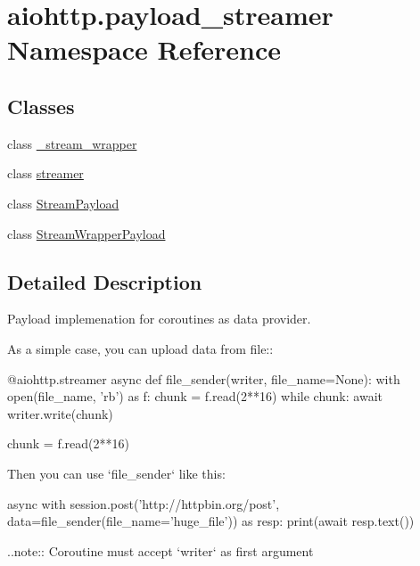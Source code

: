 \hypertarget{namespaceaiohttp_1_1payload__streamer}{}\section{aiohttp.\+payload\+\_\+streamer Namespace Reference}
\label{namespaceaiohttp_1_1payload__streamer}
\subsection*{Classes}
\begin{DoxyCompactItemize}
\item 
class \hyperlink{classaiohttp_1_1payload__streamer_1_1__stream__wrapper}{\+\_\+stream\+\_\+wrapper}
\item 
class \hyperlink{classaiohttp_1_1payload__streamer_1_1streamer}{streamer}
\item 
class \hyperlink{classaiohttp_1_1payload__streamer_1_1_stream_payload}{Stream\+Payload}
\item 
class \hyperlink{classaiohttp_1_1payload__streamer_1_1_stream_wrapper_payload}{Stream\+Wrapper\+Payload}
\end{DoxyCompactItemize}


\subsection{Detailed Description}
\begin{DoxyVerb}Payload implemenation for coroutines as data provider.

As a simple case, you can upload data from file::

   @aiohttp.streamer
   async def file_sender(writer, file_name=None):
      with open(file_name, 'rb') as f:
  chunk = f.read(2**16)
  while chunk:
      await writer.write(chunk)

      chunk = f.read(2**16)

Then you can use `file_sender` like this:

    async with session.post('http://httpbin.org/post',
                    data=file_sender(file_name='huge_file')) as resp:
print(await resp.text())

..note:: Coroutine must accept `writer` as first argument\end{DoxyVerb}
 